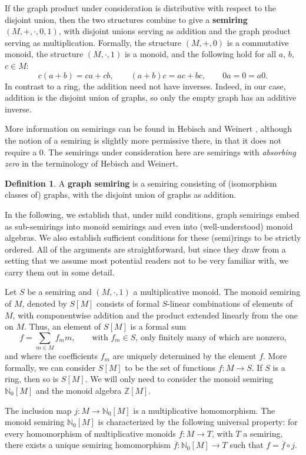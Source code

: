 \documentclass{amsart}
\theoremstyle{plain}
\theoremstyle{definition}
\newtheorem{definition}[thm]{Definition}
\newcommand{\defit}[1]{\textbf{#1}}
\newcommand{\bN}{\mathbb N}
\newcommand{\bZ}{\mathbb Z}
\begin{document}
If the graph product under consideration is distributive with respect to the disjoint union, then the two structures combine to give a \defit{semiring} $(M, +, \cdot, 0, 1)$, with disjoint unions serving as addition and the graph product serving as multiplication.
Formally, the structure $(M,+,0)$ is a commutative monoid, the structure $(M,\cdot,1)$ is a monoid, and the following hold for all $a$, $b$,~$c \in M$:
\[
  c(a+b)=ca+cb, \qquad (a+b)c = ac + bc, \qquad 0a=0=a0.
\]
In contrast to a ring, the addition need not have inverses.
Indeed, in our case, addition is the disjoint union of graphs, so only the empty graph has an additive inverse.

More information on semirings can be found in Hebisch and Weinert \cite{hebisch-weinert98}, although the notion of a semiring is slightly more permissive there, in that it does not require a $0$. The semirings under consideration here are semirings with \emph{absorbing zero} in the terminology of Hebisch and Weinert.

\begin{definition}
  A \defit{graph semiring} is a semiring consisting of \textup(isomorphism classes of\textup) graphs, with the disjoint union of graphs as addition.
\end{definition}

In the following, we establish that, under mild conditions, graph semirings embed as sub-semirings into monoid semirings and even into (well-understood) monoid algebras.
We also establish sufficient conditions for these (semi)rings to be strictly ordered.
All of the arguments are straightforward, but since they draw from a setting that we assume most potential readers not to be very familiar with, we carry them out in some detail.

Let $S$ be a semiring and $(M,\cdot,1)$ a multiplicative monoid.
The monoid semiring of $M$, denoted by $S[M]$ consists of formal $S$-linear combinations of elements of $M$, with componentwise addition and the product extended linearly from the one on $M$.
Thus, an element of $S[M]$ is a formal sum
\[
  f=\sum_{m \in M} f_m m, \qquad\text{with $f_m \in S$, only finitely many of which are nonzero,}
\]
and where the coefficients $f_m$ are uniquely determined by the element $f$.
More formally, we can consider $S[M]$ to be the set of functions $f\colon M \to S$.
If $S$ is a ring, then so is $S[M]$.
We will only need to consider the monoid semiring $\bN_0[M]$ and the monoid algebra $\bZ[M]$.

The inclusion map $j \colon M \to \bN_0[M]$ is a multiplicative homomorphism.
The monoid semiring $\bN_0[M]$ is characterized by the following universal property: for every homomorphism of multiplicative monoids $f\colon M \to T$, with $T$ a semiring, there exists a unique semiring homomorphism $\overline{f}\colon \bN_0[M] \to T$ such that $f = \overline{f} \circ j$.
\end{document}
